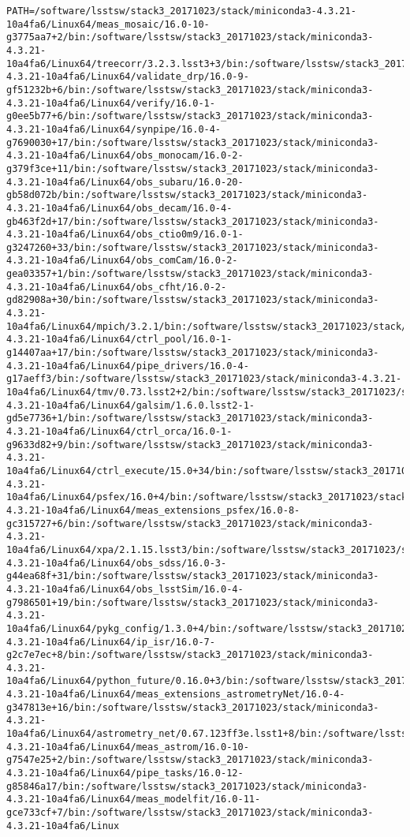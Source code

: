 \begin{verbatim}
PATH=/software/lsstsw/stack3_20171023/stack/miniconda3-4.3.21-10a4fa6/Linux64/meas_mosaic/16.0-10-g3775aa7+2/bin:/software/lsstsw/stack3_20171023/stack/miniconda3-4.3.21-10a4fa6/Linux64/treecorr/3.2.3.lsst3+3/bin:/software/lsstsw/stack3_20171023/stack/miniconda3-4.3.21-10a4fa6/Linux64/validate_drp/16.0-9-gf51232b+6/bin:/software/lsstsw/stack3_20171023/stack/miniconda3-4.3.21-10a4fa6/Linux64/verify/16.0-1-g0ee5b77+6/bin:/software/lsstsw/stack3_20171023/stack/miniconda3-4.3.21-10a4fa6/Linux64/synpipe/16.0-4-g7690030+17/bin:/software/lsstsw/stack3_20171023/stack/miniconda3-4.3.21-10a4fa6/Linux64/obs_monocam/16.0-2-g379f3ce+11/bin:/software/lsstsw/stack3_20171023/stack/miniconda3-4.3.21-10a4fa6/Linux64/obs_subaru/16.0-20-gb58d072b/bin:/software/lsstsw/stack3_20171023/stack/miniconda3-4.3.21-10a4fa6/Linux64/obs_decam/16.0-4-gb463f2d+17/bin:/software/lsstsw/stack3_20171023/stack/miniconda3-4.3.21-10a4fa6/Linux64/obs_ctio0m9/16.0-1-g3247260+33/bin:/software/lsstsw/stack3_20171023/stack/miniconda3-4.3.21-10a4fa6/Linux64/obs_comCam/16.0-2-gea03357+1/bin:/software/lsstsw/stack3_20171023/stack/miniconda3-4.3.21-10a4fa6/Linux64/obs_cfht/16.0-2-gd82908a+30/bin:/software/lsstsw/stack3_20171023/stack/miniconda3-4.3.21-10a4fa6/Linux64/mpich/3.2.1/bin:/software/lsstsw/stack3_20171023/stack/miniconda3-4.3.21-10a4fa6/Linux64/ctrl_pool/16.0-1-g14407aa+17/bin:/software/lsstsw/stack3_20171023/stack/miniconda3-4.3.21-10a4fa6/Linux64/pipe_drivers/16.0-4-g17aeff3/bin:/software/lsstsw/stack3_20171023/stack/miniconda3-4.3.21-10a4fa6/Linux64/tmv/0.73.lsst2+2/bin:/software/lsstsw/stack3_20171023/stack/miniconda3-4.3.21-10a4fa6/Linux64/galsim/1.6.0.lsst2-1-gd5e7736+1/bin:/software/lsstsw/stack3_20171023/stack/miniconda3-4.3.21-10a4fa6/Linux64/ctrl_orca/16.0-1-g9633d82+9/bin:/software/lsstsw/stack3_20171023/stack/miniconda3-4.3.21-10a4fa6/Linux64/ctrl_execute/15.0+34/bin:/software/lsstsw/stack3_20171023/stack/miniconda3-4.3.21-10a4fa6/Linux64/psfex/16.0+4/bin:/software/lsstsw/stack3_20171023/stack/miniconda3-4.3.21-10a4fa6/Linux64/meas_extensions_psfex/16.0-8-gc315727+6/bin:/software/lsstsw/stack3_20171023/stack/miniconda3-4.3.21-10a4fa6/Linux64/xpa/2.1.15.lsst3/bin:/software/lsstsw/stack3_20171023/stack/miniconda3-4.3.21-10a4fa6/Linux64/obs_sdss/16.0-3-g44ea68f+31/bin:/software/lsstsw/stack3_20171023/stack/miniconda3-4.3.21-10a4fa6/Linux64/obs_lsstSim/16.0-4-g7986501+19/bin:/software/lsstsw/stack3_20171023/stack/miniconda3-4.3.21-10a4fa6/Linux64/pykg_config/1.3.0+4/bin:/software/lsstsw/stack3_20171023/stack/miniconda3-4.3.21-10a4fa6/Linux64/ip_isr/16.0-7-g2c7e7ec+8/bin:/software/lsstsw/stack3_20171023/stack/miniconda3-4.3.21-10a4fa6/Linux64/python_future/0.16.0+3/bin:/software/lsstsw/stack3_20171023/stack/miniconda3-4.3.21-10a4fa6/Linux64/meas_extensions_astrometryNet/16.0-4-g347813e+16/bin:/software/lsstsw/stack3_20171023/stack/miniconda3-4.3.21-10a4fa6/Linux64/astrometry_net/0.67.123ff3e.lsst1+8/bin:/software/lsstsw/stack3_20171023/stack/miniconda3-4.3.21-10a4fa6/Linux64/meas_astrom/16.0-10-g7547e25+2/bin:/software/lsstsw/stack3_20171023/stack/miniconda3-4.3.21-10a4fa6/Linux64/pipe_tasks/16.0-12-g85846a17/bin:/software/lsstsw/stack3_20171023/stack/miniconda3-4.3.21-10a4fa6/Linux64/meas_modelfit/16.0-11-gce733cf+7/bin:/software/lsstsw/stack3_20171023/stack/miniconda3-4.3.21-10a4fa6/Linux
\end{verbatim}
